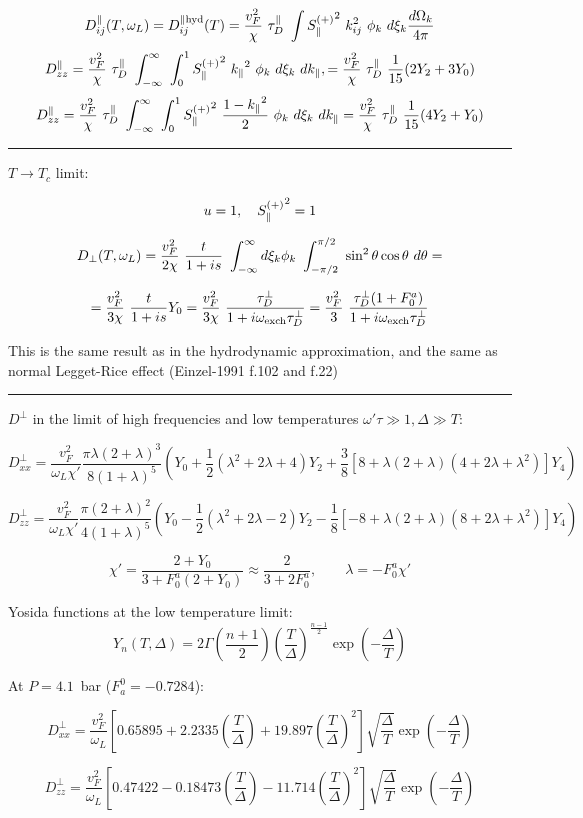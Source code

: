 \documentclass[a4paper]{article}
\begin{document}
$$
D^\parallel_{ij}(T, \ol) = D^{\parallel {\rm hyd}}_{ij}(T) =
  \frac{v_F^2}{\chi}\ \t
  \  \int \sp \ k_{ij}^2\ \phi_k\ d\xi_k\frac{d\Omega_k}{4\pi}
$$
$$
 D^\parallel_{zz}= \frac{v_F^2}{\chi}\ \t
  \ \int_{-\infty}^{\infty}\ \int_{0}^{1}
  \sp\ \kpa^2\ \phi_k\ d\xi_k\ d\kpa,
 = \frac{v_F^2}{\chi}\ \t\ \frac{1}{15}(2Y_2+3Y_0)
$$
$$
 D^\parallel_{zz}= \frac{v_F^2}{\chi}\ \t
  \ \int_{-\infty}^{\infty}\ \int_{0}^{1}
  \sp\ \frac{1-\kpa^2}{2}\ \phi_k\ d\xi_k\ d\kpa
 = \frac{v_F^2}{\chi}\ \t\ \frac{1}{15}(4Y_2+Y_0)
$$

\hrule\medskip

$T\rightarrow T_c$ limit:

$$
u=1,\quad
{\sp} = 1
$$

$$
D_\perp (T, \ol) =
  \frac{v_F^2}{2\chi}
  \ \frac{t}{1+is}
  \ \int_{-\infty}^{\infty}
  d\xi_k\phi_k
  \ \int_{-\pi/2}^{\pi/2}
  \  \sin^2\theta \cos\theta \ d\theta =
$$

$$
  = \frac{v_F^2}{3\chi} \ \frac{t}{1+is} Y_0
  = \frac{v_F^2}{3\chi} \ \frac{\tdp}{1+i\oe\tdp}
  = \frac{v_F^2}{3}\ \frac{\tdp (1+F_0^a)}{1+i\oe\tdp}
$$

This is the same result as in the hydrodynamic approximation,
and the same as normal Legget-Rice effect (Einzel-1991 f.102 and f.22)

\medskip
\hrule\medskip

$D^\perp$ in the limit of high frequencies and low temperatures
$\omega'\tau \gg 1,  \Delta \gg T$:

$$
D_{xx}^\perp =
\frac{v_F^2}{\omega_L \chi'}
\frac{\pi\lambda(2+\lambda)^3}{8(1+\lambda)^5}
\left(
Y_0
+ \frac12 (\lambda^2+2\lambda+4) Y_2
+ \frac38 [8+\lambda(2+\lambda)(4+2\lambda+\lambda^2)] Y_4
\right)
$$

$$
D_{zz}^\perp =
\frac{v_F^2}{\omega_L \chi'}
\frac{\pi(2+\lambda)^2}{4(1+\lambda)^5}
\left(
Y_0
- \frac12 (\lambda^2+2\lambda-2) Y_2
- \frac18 [-8+\lambda(2+\lambda)(8+2\lambda+\lambda^2)] Y_4
\right)
$$

$$
\chi' = \frac{2+Y_0}{3+F_0^a(2+Y_0)} \approx \frac{2}{3+2F_0^a},\qquad
\lambda = -F_0^a \chi'
$$


Yosida functions at the low temperature limit:
$$
Y_n(T,\Delta) =
2\Gamma\left(\frac{n+1}{2}\right)
\left(\frac{T}{\Delta}\right)^{\frac{n-1}{2}}
\exp\left(-\frac{\Delta}{T}\right)
$$

At $P=4.1$~bar ($F^0_a = -0.7284$):

$$
D_{xx}^\perp =
\frac{v_F^2}{\omega_L}
\left[
0.65895
+2.2335 \left(\frac{T}{\Delta}\right)
+19.897 \left(\frac{T}{\Delta}\right)^2
\right]
\sqrt{\frac{\Delta}{T}}
\exp\left(-\frac{\Delta}{T}\right)
$$

$$
D_{zz}^\perp =
\frac{v_F^2}{\omega_L}
\left[
 0.47422
-0.18473 \left(\frac{T}{\Delta}\right)
-11.714  \left(\frac{T}{\Delta}\right)^2
\right]
\sqrt{\frac{\Delta}{T}}
\exp\left(-\frac{\Delta}{T}\right)
$$
\end{document}
